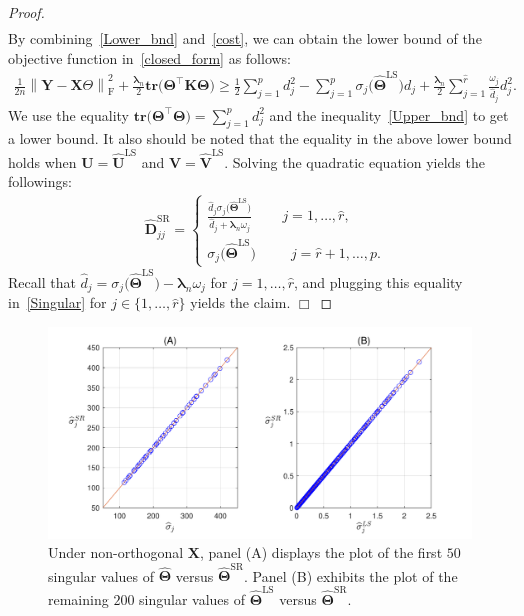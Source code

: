 \documentclass[alpha-refs]{wiley-article}
\begin{document}
\begin{proof}
\begin{align}
\end{align}
By combining~\eqref{Lower_bnd} and~\eqref{cost}, we can obtain the lower bound of the objective function in~\eqref{closed_form} as follows:
\begin{align*}
    \frac{1}{2n} \left\| \boldsymbol{Y}-\boldsymbol{X}\Theta \right\|_{\text{F}}^{2} + \frac{\boldsymbol{\lambda}_{n}}{2}
    \textbf{tr}\big(\boldsymbol{\Theta}^{\top} \boldsymbol{K} \boldsymbol{\Theta} \big) \geq
    \frac{1}{2} \sum_{j=1}^{p} d_{j}^2 - \sum_{j=1}^{p} \sigma_{j}\big( \widehat{\boldsymbol{\Theta}}^{\text{LS}} \big)d_{j}  + \frac{\boldsymbol{\lambda}_{n}}{2}\sum_{j=1}^{\widehat{r}} \frac{\omega_{j}}{\widehat{d}_{j}}d_{j}^2.
\end{align*}
We use the equality $\textbf{tr}\big(\boldsymbol{\Theta}^{\top}\boldsymbol{\Theta}\big)=\sum_{j=1}^{p}d_{j}^{2}$ and the inequality~\eqref{Upper_bnd} to get a lower bound.
It also should be noted that the equality in the above lower bound holds when $\boldsymbol{U}=\widehat{\boldsymbol{U}}^{\text{LS}}$ and $\boldsymbol{V}=\widehat{\boldsymbol{V}}^{\text{LS}}$.
Solving the quadratic equation yields the followings:
\begin{align} \label{Singular}
    &\widehat{\boldsymbol{D}}^{\text{SR}}_{jj} =
    \begin{cases}
        \frac{\widehat{d}_{j}\sigma_{j}\big(\widehat{\boldsymbol{\Theta}}^{\text{LS}} \big) }{\widehat{d}_{j} + \boldsymbol{\lambda}_{n}\omega_{j}}
        \qquad \, j = 1,\dots,\widehat{r}, \\
        \sigma_{j}\big(\widehat{\boldsymbol{\Theta}}^{\text{LS}} \big)
        \qquad \,\,\, j = \widehat{r}+1,\dots,p.
    \end{cases}
\end{align}
Recall that $\widehat{d}_{j}=\sigma_{j}\big(\widehat{\boldsymbol{\Theta}}^{\text{LS}} \big)-\boldsymbol{\lambda}_{n}\omega_{j}$ for $j=1,\dots,\widehat{r}$,
and plugging this equality in~\eqref{Singular} for $j\in\{1,\dots,\widehat{r}\}$ yields the claim.
$\Box$
\end{proof}

\begin{figure} [b!]
  \includegraphics[width=120mm]{Figure/Fig2.pdf}
  \centering
  \caption{ Under non-orthogonal $\boldsymbol{X}$, panel (A) displays the plot of the first $50$ singular values of $\widehat{\boldsymbol{\Theta}}$ versus $\widehat{\boldsymbol{\Theta}}^{\text{SR}}$.
  Panel (B) exhibits the plot of the remaining $200$ singular values of $\widehat{\boldsymbol{\Theta}}^{\text{LS}}$ versus $\widehat{\boldsymbol{\Theta}}^{\text{SR}}$.}
  \label{Fig2}
\end{figure}
\end{document}
